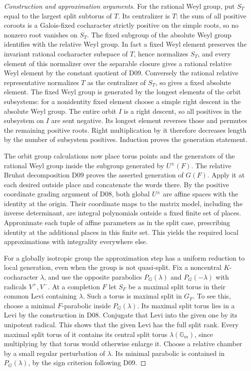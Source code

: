\documentclass[11pt,a4paper,openany,oneside]{book}
\theoremstyle{resultstyle}
\theoremstyle{definition}
\numberwithin{equation}{chapter}
\newcommand{\Gm}{\mathbb{G}_m}
\begin{document}
\begin{proof}[Construction and approximation arguments]
For the rational Weyl group, put \(S_T\) equal to the
largest split subtorus of \(T\). Its centralizer is \(T\):
the sum of all positive coroots is a Galois-fixed
cocharacter strictly positive on the simple roots, so
no nonzero root vanishes on \(S_T\). The fixed subgroup
of the absolute Weyl group identifies with the relative
Weyl group. In fact a fixed Weyl element preserves the
invariant rational cocharacter subspace of \(T\), hence
normalizes \(S_T\), and every element of this normalizer
over the separable closure gives a rational relative
Weyl element by the constant quotient of D09. Conversely
the rational relative representative normalizes \(T\)
as the centralizer of \(S_T\), so gives a fixed absolute
element. The fixed Weyl group is generated by the longest
elements of the orbit subsystems: for a nonidentity fixed
element choose a simple right descent in the absolute
Weyl group. The entire orbit \(I\) is a right descent,
so all positives in the subsystem on \(I\) are sent
negative. Its longest element reverses those and permutes
the remaining positive roots. Right multiplication by it
therefore decreases length by the number of subsystem
positives. Induction proves the generation statement.

The orbit group calculations now place torus points and
the generators of the rational Weyl group inside the
subgroup generated by \(U^\pm(F)\). The relative Bruhat
decomposition D09 proves the asserted generation of \(G(F)\).
Apply it at each desired outside place and concatenate
the words there. By the positive coordinate grading
argument of D08, both global \(U^\pm\) are affine spaces
with the identity at the origin. Their coordinate maps
to the matrix model, including the inverse determinant,
are integral polynomials outside a fixed finite set of
places. Approximate each tuple of affine parameters as
in the split case, prescribing identity at the additional
places in this finite set. This yields the required
local approximations with integrality everywhere else.

For a globally isotropic group the approximation step has
a uniform reduction to local generation, even when the
group is not quasi-split. Fix a noncentral \(K\)-cocharacter
\(\lambda\), and use the opposite parabolics \(P_G(\lambda)\)
and \(P_G(-\lambda)\) with radicals \(V^+,V^-\).
At a completion \(F\) let \(S_F\) be a maximal split torus
in their common Levi containing \(\lambda\). Such a torus
is maximal split in \(G_F\). To see this, choose a minimal
\(F\)-parabolic inside \(P_G(\lambda)\). Its maximal split
torus lies in a Levi by the construction in D08. Conjugate
that Levi into the given one by its unipotent radical.
This shows that the given Levi has the full split rank.
Every maximal split torus of it contains its central split
torus \(\lambda(\Gm)\), since multiplying by that torus
would otherwise enlarge it. Choose a relative chamber
by a small regular perturbation of \(\lambda\).
Its minimal parabolic is contained in \(P_G(\lambda)\),
by the sign criterion following D09.


\end{proof}
\end{document}
